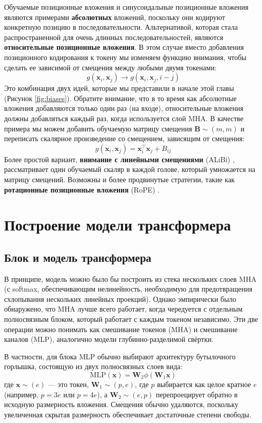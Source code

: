 Обучаемые позиционные вложения и синусоидальные позиционные вложения являются примерами \textbf{абсолютных} вложений, поскольку они кодируют конкретную позицию в последовательности. Альтернативой, которая стала распространенной для очень длинных последовательностей, являются \textbf{относительные позиционные вложения}. В этом случае вместо добавления позиционного кодирования к токену мы изменяем функцию внимания, чтобы сделать ее зависимой от смещения между любыми двумя токенами:
%
$$
g(\mathbf{x}_i, \mathbf{x}_j)\rightarrow g(\mathbf{x}_i, \mathbf{x}_j, i-j)
$$
%
Это комбинация двух идей, которые мы представили в начале этой главы (Рисунок \ref{fig:biases}). Обратите внимание, что в то время как абсолютные вложения добавляются только один раз (на входе), относительные вложения должны добавляться каждый раз, когда используется слой MHA. В качестве примера мы можем добавить обучаемую матрицу смещения $\mathbf{B} \sim (m,m)$ и переписать скалярное произведение со смещением, зависящим от смещения:
%
$$
g(\mathbf{x}_i,\mathbf{x}_j)=\mathbf{x}_i^\top\mathbf{x}_j+B_{ij}
$$
%
Более простой вариант, \textbf{внимание с линейными смещениями} (ALiBi) \cite{press2021train}, рассматривает один обучаемый скаляр в каждой голове, который умножается на матрицу смещений. Возможны и более продвинутые стратегии, такие как \textbf{ротационные позиционные вложения} (RoPE) \cite{su2024roformer}.

\section{Построение модели трансформера}
\subsection{Блок и модель трансформера}
\label{subsec:transformer_block}

В принципе, модель можно было бы построить из стека нескольких слоев MHA (с softmax, обеспечивающим нелинейность, необходимую для предотвращения схлопывания нескольких линейных проекций). Однако эмпирически было обнаружено, что MHA лучше всего работает, когда чередуется с отдельным полносвязным блоком, который работает с каждым токеном независимо. Эти две операции можно понимать как смешивание токенов (MHA) и смешивание каналов (MLP), аналогично модели глубинно-разделимой свёртки.

В частности, для блока MLP обычно выбирают архитектуру бутылочного горлышка, состоящую из двух полносвязных слоев вида:
%
$$
\text{MLP}(\mathbf{x})=\mathbf{W}_2\phi\left(\mathbf{W}_1\mathbf{x}\right)
$$
%
где $\mathbf{x} \sim (e)$ — это токен, $\mathbf{W}_1 \sim (p, e)$, где $p$ выбирается как целое кратное $e$ (например, $p=3e$ или $p=4e$), а $\mathbf{W}_2 \sim (e,p)$ перепроецирует обратно в исходную размерность вложения. Смещения обычно удаляются, поскольку увеличенная скрытая размерность обеспечивает достаточные степени свободы.

